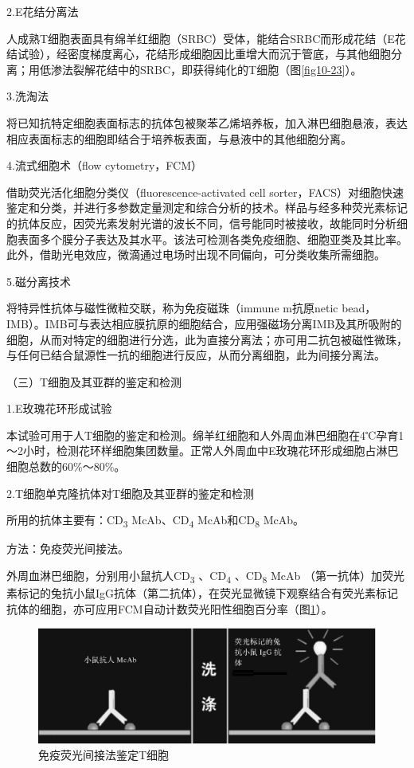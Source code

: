 2.E花结分离法

人成熟T细胞表面具有绵羊红细胞（SRBC）受体，能结合SRBC而形成花结（E花结试验），经密度梯度离心，花结形成细胞因比重增大而沉于管底，与其他细胞分离；用低渗法裂解花结中的SRBC，即获得纯化的T细胞（图\ref{fig10-23}）。

3.洗淘法

将已知抗特定细胞表面标志的抗体包被聚苯乙烯培养板，加入淋巴细胞悬液，表达相应表面标志的细胞即结合于培养板表面，与悬液中的其他细胞分离。

4.流式细胞术（flow cytometry，FCM）

借助荧光活化细胞分类仪（fluorescence-activated cell
sorter，FACS）对细胞快速鉴定和分类，并进行多参数定量测定和综合分析的技术。样品与经多种荧光素标记的抗体反应，因荧光素发射光谱的波长不同，信号能同时被接收，故能同时分析细胞表面多个膜分子表达及其水平。该法可检测各类免疫细胞、细胞亚类及其比率。此外，借助光电效应，微滴通过电场时出现不同偏向，可分类收集所需细胞。

5.磁分离技术

将特异性抗体与磁性微粒交联，称为免疫磁珠（immune m抗原netic
bead，IMB）。IMB可与表达相应膜抗原的细胞结合，应用强磁场分离IMB及其所吸附的细胞，从而对特定的细胞进行分选，此为直接分离法；亦可用二抗包被磁性微珠，与任何已结合鼠源性一抗的细胞进行反应，从而分离细胞，此为间接分离法。

（三）T细胞及其亚群的鉴定和检测

1.E玫瑰花环形成试验

本试验可用于人T细胞的鉴定和检测。绵羊红细胞和人外周血淋巴细胞在4℃孕育1～2小时，检测花环样细胞集团数量。正常人外周血中E玫瑰花环形成细胞占淋巴细胞总数的60\%～80\%。

2.T细胞单克隆抗体对T细胞及其亚群的鉴定和检测

所用的抗体主要有：CD\textsubscript{3} McAb、CD\textsubscript{4}
McAb和CD\textsubscript{8} McAb。

方法：免疫荧光间接法。

外周血淋巴细胞，分别用小鼠抗人CD\textsubscript{3} 、CD\textsubscript{4}
、CD\textsubscript{8} McAb
（第一抗体）加荧光素标记的兔抗小鼠IgG抗体（第二抗体），在荧光显微镜下观察结合有荧光素标记抗体的细胞，亦可应用FCM自动计数荧光阳性细胞百分率（图\ref{fig10-24}）。

\begin{figure}[!htbp]
 \centering
 \includegraphics[width=.6\textwidth]{./images/Image00178.jpg}
 \captionsetup{justification=centering}
 \caption{免疫荧光间接法鉴定T细胞}
 \label{fig10-24}
  \end{figure} 

